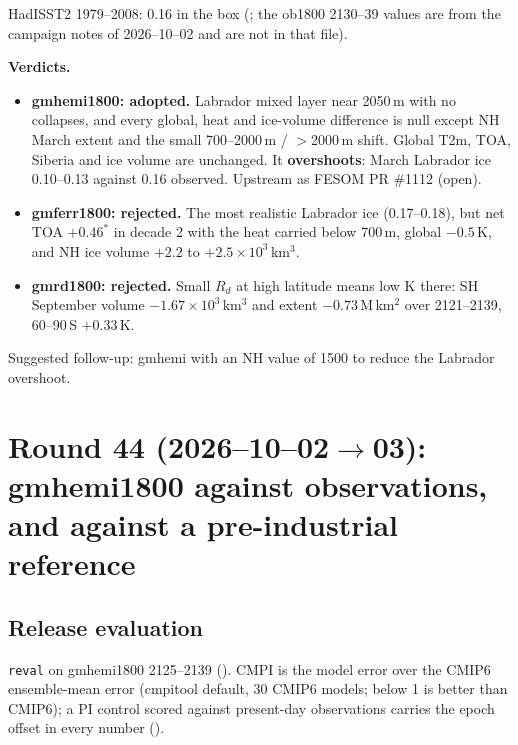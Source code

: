 \documentclass[10pt]{article}
\begin{document}
\noindent HadISST2 1979--2008: 0.16 in the box (; the
ob1800 2130--39 values are from the campaign notes of 2026--10--02 and are not in that file).

\textbf{Verdicts.}
\begin{itemize}\itemsep1pt
\item \textbf{gmhemi1800: adopted.} Labrador mixed layer near 2050\,m with no collapses, and every
      global, heat and ice-volume difference is null except NH March extent and the small
      700--2000\,m / $>$2000\,m shift. Global T2m, TOA, Siberia and ice volume are unchanged. It
      \textbf{overshoots}: March Labrador ice 0.10--0.13 against 0.16 observed. Upstream as FESOM
      PR \#1112 (open).
\item \textbf{gmferr1800: rejected.} The most realistic Labrador ice (0.17--0.18), but net TOA
      $+0.46^*$ in decade 2 with the heat carried below 700\,m, global $-0.5$\,K, and NH ice volume
      $+2.2$ to $+2.5\times10^3$\,km$^3$.
\item \textbf{gmrd1800: rejected.} Small $R_d$ at high latitude means low K there: SH September
      volume $-1.67\times10^3$\,km$^3$ and extent $-0.73$\,M\,km$^2$ over 2121--2139, 60--90\,S
      $+0.33$\,K.
\end{itemize}
Suggested follow-up: gmhemi with an NH value of 1500 to reduce the Labrador overshoot.

\section{Round 44 (2026--10--02$\to$03): gmhemi1800 against observations, and against a pre-industrial reference}\label{sec:round44}

\subsection{Release evaluation}\label{sub:r44reval}

\texttt{reval} on gmhemi1800 2125--2139 (). CMPI is the
model error over the CMIP6 ensemble-mean error (cmpitool default, 30 CMIP6 models; below 1 is
better than CMIP6); a PI control scored against present-day observations carries the epoch offset
in every number ().
\end{document}
